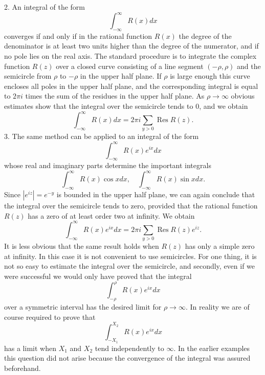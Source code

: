2. An integral of the form
\begin{equation*}
\int_ {- \infty} ^ {\infty} R (x) d x
\end{equation*}
converges if and only if in the rational function $R(x)$ the degree of the denominator is at least two units higher than the degree of the numerator, and if no pole lies on the real axis. The standard procedure is to integrate the complex function $R(z)$ over a closed curve consisting of a line segment $(- \rho, \rho)$ and the semicircle from $\rho$ to $-\rho$ in the upper half plane. If $\rho$ is large enough this curve encloses all poles in the upper half plane, and the corresponding integral is equal to $2\pi i$ times the sum of the residues in the upper half plane. As $\rho \to \infty$ obvious estimates show that the integral over the semicircle tends to 0, and we obtain
\begin{equation*}
\int_ {- \infty} ^ {\infty} R (x) d x = 2 \pi i \sum_ {y > 0} \operatorname{Res} R (z).
\end{equation*}
3. The same method can be applied to an integral of the form
\begin{equation*}
\int_ {- \infty} ^ {\infty} R (x) e ^ {i x} d x\tag{52}\label{eq:4.52}
\end{equation*}
whose real and imaginary parts determine the important integrals
\begin{equation*}
\int_ {- \infty} ^ {\infty} R (x) \cos x d x, \quad \int_ {- \infty} ^ {\infty} R (x) \sin x d x.\tag{53}\label{eq:4.53}
\end{equation*}
Since $|e^{iz}| = e^{-y}$ is bounded in the upper half plane, we can again conclude that the integral over the semicircle tends to zero, provided that the rational function $R(z)$ has a zero of at least order two at infinity. We obtain
\begin{equation*}
\int_ {- \infty} ^ {\infty} R (x) e ^ {i x} d x = 2 \pi i \sum_ {y > 0} \operatorname{Res} R (z) e ^ {i z}.
\end{equation*}
It is less obvious that the same result holds when $R(z)$ has only a simple zero at infinity. In this case it is not convenient to use semicircles. For one thing, it is not so easy to estimate the integral over the semicircle, and secondly, even if we were successful we would only have proved that the integral
\begin{equation*}
\int_ {- \rho} ^ {\rho} R (x) e ^ {i x} d x
\end{equation*}
over a symmetric interval has the desired limit for $\rho\to\infty$. In reality we are of course required to prove that
\begin{equation*}
\int_ {- X _ {1}} ^ {X _ {2}} R (x) e ^ {i x} d x
\end{equation*}
has a limit when $X_{1}$ and $X_{2}$ tend independently to $\infty$. In the earlier examples this question did not arise because the convergence of the integral was assured beforehand.

